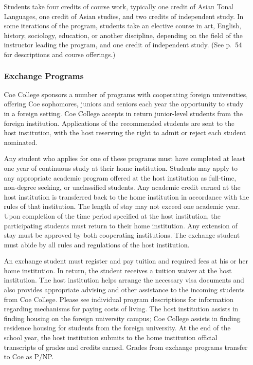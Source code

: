 \documentclass[
  letterpaper,
]{scrbook}
\begin{document}
Students take four credits of course work, typically one credit of Asian
Tonal Languages, one credit of Asian studies, and two credits of
independent study. In some iterations of the program, students take an
elective course in art, English, history, sociology, education, or
another discipline, depending on the field of the instructor leading the
program, and one credit of independent study. (See p.~54 for
descriptions and course offerings.)

\subsubsection{Exchange Programs}\label{exchange-programs}

Coe College sponsors a number of programs with cooperating foreign
universities, offering Coe sophomores, juniors and seniors each year the
opportunity to study in a foreign setting. Coe College accepts in return
junior-level students from the foreign institution. Applications of the
recommended students are sent to the host institution, with the host
reserving the right to admit or reject each student nominated.

Any student who applies for one of these programs must have completed at
least one year of continuous study at their home institution. Students
may apply to any appropriate academic program offered at the host
institution as full-time, non-degree seeking, or unclassified students.
Any academic credit earned at the host institution is transferred back
to the home institution in accordance with the rules of that
institution. The length of stay may not exceed one academic year. Upon
completion of the time period specified at the host institution, the
participating students must return to their home institution. Any
extension of stay must be approved by both cooperating institutions. The
exchange student must abide by all rules and regulations of the host
institution.

An exchange student must register and pay tuition and required fees at
his or her home institution. In return, the student receives a tuition
waiver at the host institution. The host institution helps arrange the
necessary visa documents and also provides appropriate advising and
other assistance to the incoming students from Coe College. Please see
individual program descriptions for information regarding mechanisms for
paying costs of living. The host institution assists in finding housing
on the foreign university campus; Coe College assists in finding
residence housing for students from the foreign university. At the end
of the school year, the host institution submits to the home institution
official transcripts of grades and credits earned. Grades from exchange
programs transfer to Coe as P/NP.
\end{document}
